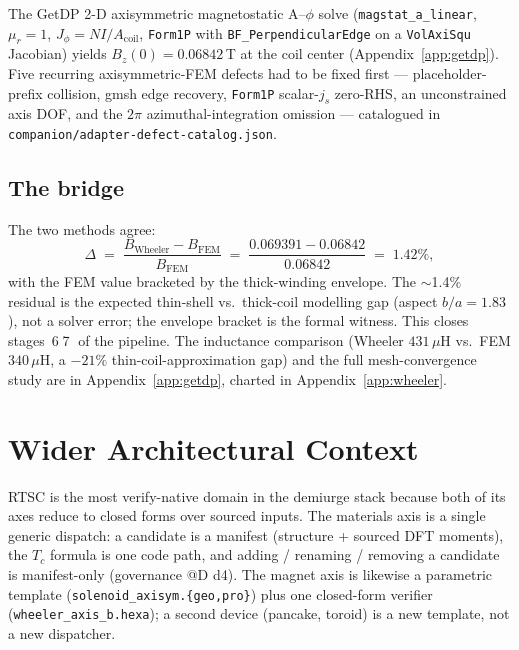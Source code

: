 \documentclass[11pt,a4paper]{article}
\begin{document}
The GetDP \citep{getdp} 2-D axisymmetric magnetostatic A--$\phi$ solve
(\texttt{magstat\_a\_linear}, $\mu_r\!=\!1$, $J_\phi\!=\!NI/A_{\text{coil}}$,
\texttt{Form1P} with \texttt{BF\_PerpendicularEdge} on a \texttt{VolAxiSqu}
Jacobian) yields $B_z(0)\!=\!0.06842$\,T at the coil center
(Appendix~\ref{app:getdp}). Five recurring axisymmetric-FEM defects had
to be fixed first --- placeholder-prefix collision, gmsh edge recovery,
\texttt{Form1P} scalar-$j_s$ zero-RHS, an unconstrained axis DOF, and
the $2\pi$ azimuthal-integration omission --- catalogued in
\texttt{companion/adapter-defect-catalog.json}.

\subsection{The bridge}

The two methods agree:
\begin{equation}
\Delta \;=\; \frac{B_{\text{Wheeler}} - B_{\text{FEM}}}{B_{\text{FEM}}}
  \;=\; \frac{0.069391 - 0.06842}{0.06842} \;=\; 1.42\%,
\label{eq:bridge}
\end{equation}
with the FEM value bracketed by the thick-winding envelope. The
$\sim$1.4\% residual is the expected thin-shell vs.\ thick-coil
modelling gap (aspect $b/a\!=\!1.83$), not a solver error; the envelope
bracket is the formal witness. This closes
stages~\textcircled{\scriptsize 6}\textcircled{\scriptsize 7} of the
pipeline. The inductance comparison (Wheeler $431$\,$\mu$H vs.\ FEM
$340$\,$\mu$H, a $-21\%$ thin-coil-approximation gap) and the full
mesh-convergence study are in Appendix~\ref{app:getdp}, charted in
Appendix~\ref{app:wheeler}.

\section{Wider Architectural Context}
\label{sec:context}

RTSC is the most verify-native domain in the demiurge stack because
both of its axes reduce to closed forms over sourced inputs. The
materials axis is a single generic dispatch: a candidate is a manifest
(structure + sourced DFT moments), the $T_c$ formula is one code path,
and adding / renaming / removing a candidate is manifest-only
(governance @D d4). The magnet axis is likewise a parametric template
(\texttt{solenoid\_axisym.\{geo,pro\}}) plus one closed-form verifier
(\texttt{wheeler\_axis\_b.hexa}); a second device (pancake, toroid) is
a new template, not a new dispatcher.
\end{document}
